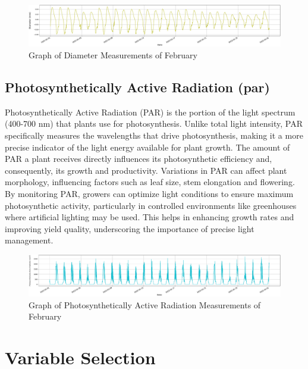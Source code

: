 \begin{figure}[htbp]
    \centering
    \includegraphics[width=15 cm]{4_ChapterMaterials/figuras/train_data_Diameter.pdf}
    \caption{Graph of Diameter Measurements of February}
    \end{figure}

\subsection{Photosynthetically Active Radiation (par)}

Photosynthetically Active Radiation (PAR) is the portion of the light spectrum (400-700 nm) that plants use for photosynthesis. Unlike total light intensity, PAR specifically measures the wavelengths that drive photosynthesis, making it a more precise indicator of the light energy available for plant growth. The amount of PAR a plant receives directly influences its photosynthetic efficiency and, consequently, its growth and productivity. Variations in PAR can affect plant morphology, influencing factors such as leaf size, stem elongation and flowering. By monitoring PAR, growers can optimize light conditions to ensure maximum photosynthetic activity, particularly in controlled environments like greenhouses where artificial lighting may be used. This helps in enhancing growth rates and improving yield quality, underscoring the importance of precise light management.

\begin{figure}[htbp]
    \centering
    \includegraphics[width=15 cm]{4_ChapterMaterials/figuras/train_data_Photosynthetically_Active_Radiation.pdf}
    \caption{Graph of Photosynthetically Active Radiation Measurements of February}
    \end{figure}

\section{Variable Selection}

